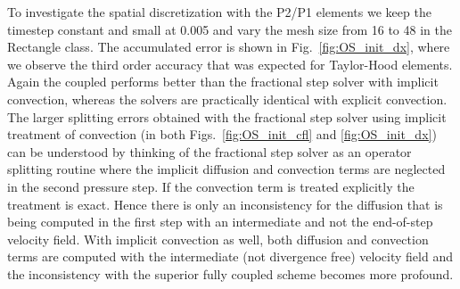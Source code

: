 To investigate the spatial discretization with the P2/P1 elements we keep the timestep constant and small at 0.005 and vary the mesh size from 16 to 48 in the Rectangle class. The accumulated error is shown in Fig.~\ref{fig:OS_init_dx}, where we observe the third order accuracy that was expected for Taylor-Hood elements. Again the coupled performs better than the fractional step solver with implicit convection, whereas the solvers are practically identical with explicit convection. The larger splitting errors obtained with the fractional step solver using implicit treatment of convection (in both Figs.~\ref{fig:OS_init_cfl} and \ref{fig:OS_init_dx}) can be understood by thinking of the fractional step solver as an operator splitting routine where the implicit diffusion and convection terms are neglected in the second pressure step. If the convection term is treated explicitly the treatment is exact. Hence there is only an inconsistency for the diffusion that is being computed in the first step with an intermediate and not the end-of-step velocity field. With implicit convection as well, both diffusion and convection terms are computed with the intermediate (not divergence free) velocity field and the inconsistency with the superior fully coupled scheme becomes more profound.

